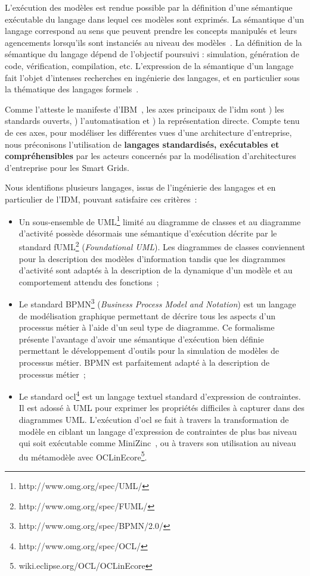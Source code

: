 L'exécution des modèles est rendue possible par la définition d'une sémantique exécutable du langage dans lequel ces modèles sont exprimés. La sémantique d'un langage correspond au sens que peuvent prendre les concepts manipulés et leurs agencements lorsqu'ils sont instanciés au niveau des modèles~\cite{jezequel2012ingenierie}. La définition de la sémantique du langage dépend de l'objectif poursuivi : simulation, génération de code, vérification, compilation, etc. L'expression de la sémantique d'un langage fait l'objet d'intenses recherches en ingénierie des langages, et en particulier sous la thématique des langages formels~\cite{kleppe2007language}. 

Comme l'atteste le manifeste d'IBM~\cite{chesbrough2006research}, les axes principaux de l'\gls{idm} sont \primo\!) les standards ouverts, \secundo\!) l'automatisation et \tertio\!) la représentation directe. Compte tenu de ces axes, pour modéliser les différentes vues d'une architecture d'entreprise, nous préconisons l'utilisation de \textbf{langages standardisés, exécutables et compréhensibles} par les acteurs concernés par la modélisation d'architectures d'entreprise pour les Smart Grids. 

Nous identifions plusieurs langages, issus de l'ingénierie des langages et en particulier de l'IDM, pouvant satisfaire ces critères~:

\begin{itemize}

\item Un sous-ensemble de UML\footnote{http://www.omg.org/spec/UML/} limité au diagramme de classes et au diagramme d'activité possède désormais une sémantique d'exécution décrite par le standard fUML\footnote{http://www.omg.org/spec/FUML/} (\textit{Foundational UML}). Les diagrammes de classes conviennent pour la description des modèles d'information tandis que les diagrammes d'activité sont adaptés à la description de la dynamique d'un modèle et au comportement attendu des fonctions~;

\item Le standard BPMN\footnote{http://www.omg.org/spec/BPMN/2.0/} (\textit{Business Process Model and Notation}) est un langage de modélisation graphique permettant de décrire tous les aspects d'un processus métier à l'aide d'un seul type de diagramme. Ce formalisme présente l'avantage d'avoir une sémantique d'exécution bien définie permettant le développement d'outils pour la simulation de modèles de processus métier. BPMN est parfaitement adapté à la description de processus métier~;

\item Le standard \gls{ocl}\footnote{http://www.omg.org/spec/OCL/} est un langage textuel standard d'expression de contraintes. Il est adossé à UML pour exprimer les propriétés difficiles à capturer dans des diagrammes UML. L'exécution d'\gls{ocl} se fait à travers la transformation de modèle en ciblant un langage d'expression de contraintes de plus bas niveau qui soit exécutable comme MiniZinc~\cite{nethercote2007minizinc}, ou à travers son utilisation au niveau du métamodèle avec OCLinEcore\footnote{wiki.eclipse.org/OCL/OCLinEcore}.

\end{itemize}

